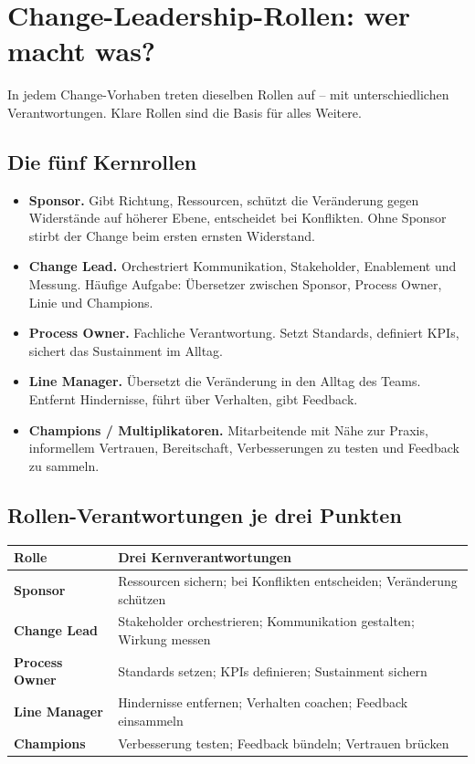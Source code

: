 \documentclass[11pt,a4paper,oneside]{article}
\newcommand{\fachbegriff}[1]{\textbf{#1}}
\begin{document}
\section{Change-Leadership-Rollen: wer macht was?}

In jedem Change-Vorhaben treten dieselben Rollen auf -- mit unterschiedlichen Verantwortungen. Klare Rollen sind die Basis für alles Weitere.

\subsection{Die fünf Kernrollen}

\begin{itemize}
  \item \fachbegriff{Sponsor.} Gibt Richtung, Ressourcen, schützt die Veränderung gegen Widerstände auf höherer Ebene, entscheidet bei Konflikten. Ohne Sponsor stirbt der Change beim ersten ernsten Widerstand.
  \item \fachbegriff{Change Lead.} Orchestriert Kommunikation, Stakeholder, Enablement und Messung. Häufige Aufgabe: Übersetzer zwischen Sponsor, Process Owner, Linie und Champions.
  \item \fachbegriff{Process Owner.} Fachliche Verantwortung. Setzt Standards, definiert KPIs, sichert das Sustainment im Alltag.
  \item \fachbegriff{Line Manager.} Übersetzt die Veränderung in den Alltag des Teams. Entfernt Hindernisse, führt über Verhalten, gibt Feedback.
  \item \fachbegriff{Champions / Multiplikatoren.} Mitarbeitende mit Nähe zur Praxis, informellem Vertrauen, Bereitschaft, Verbesserungen zu testen und Feedback zu sammeln.
\end{itemize}

\subsection{Rollen-Verantwortungen je drei Punkten}

\begin{tabularx}{\linewidth}{@{}>{\bfseries}lX@{}}
\toprule
Rolle & Drei Kernverantwortungen \\
\midrule
Sponsor & Ressourcen sichern; bei Konflikten entscheiden; Veränderung schützen \\
Change Lead & Stakeholder orchestrieren; Kommunikation gestalten; Wirkung messen \\
Process Owner & Standards setzen; KPIs definieren; Sustainment sichern \\
Line Manager & Hindernisse entfernen; Verhalten coachen; Feedback einsammeln \\
Champions & Verbesserung testen; Feedback bündeln; Vertrauen brücken \\
\bottomrule
\end{tabularx}
\end{document}
